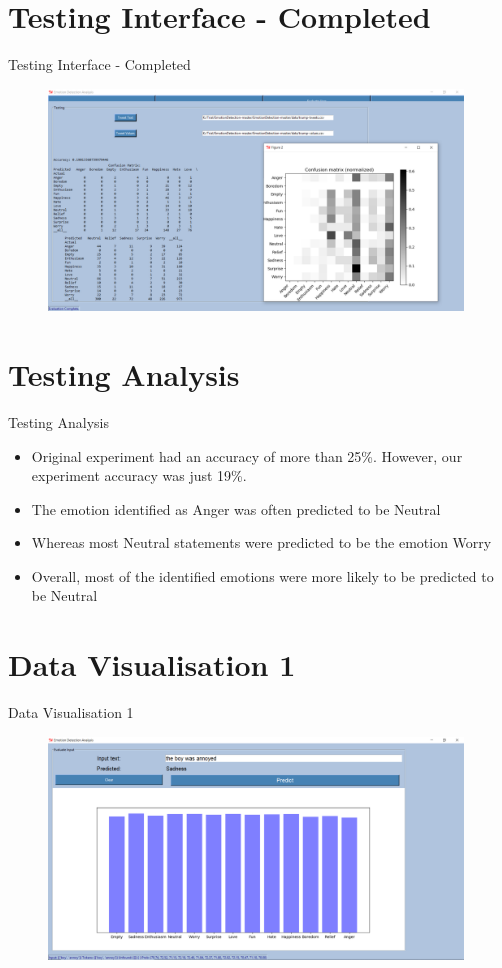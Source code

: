 \documentclass{beamer}
\begin{document}
\section{Testing Interface - Completed}
\begin{frame}{Testing Interface - Completed}
\begin{figure}[H]
\centering
\includegraphics[width=110mm]{TestingGUI-Complete.png}
\end{figure}
\end{frame}

\section{Testing Analysis}
\begin{frame}{Testing Analysis}
\begin{itemize}
\item Original experiment had an accuracy of more than 25\%. However, our experiment accuracy was just 19\%.
\item The emotion identified as Anger was often predicted to be Neutral 
\item Whereas most Neutral statements were predicted to be the emotion Worry
\item Overall, most of the identified emotions were more likely to be predicted to be Neutral
\end{itemize}
\end{frame}

\section{Data Visualisation 1}
\begin{frame}{Data Visualisation 1}
\begin{figure}[H]
\centering
\includegraphics[width=110mm]{DV3.png}
\end{figure}
\end{frame}
\end{document}
